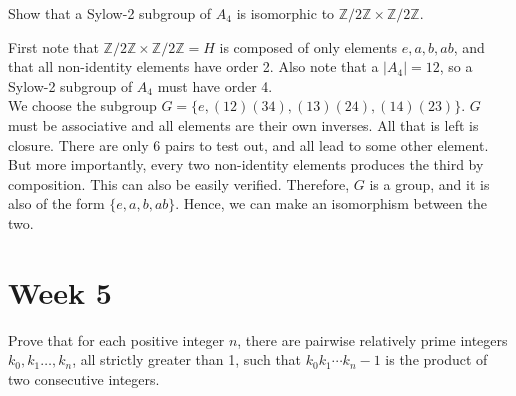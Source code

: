 \documentclass{scrartcl}
\begin{document}
\begin{problem}[7]
    Show that a Sylow-2 subgroup of $A_4$ is isomorphic to $\mathbb{Z}/2\mathbb{Z} \times \mathbb{Z}/2\mathbb{Z}$.
\end{problem}

\begin{soln}
    First note that $\mathbb{Z}/2\mathbb{Z} \times \mathbb{Z}/2\mathbb{Z}=H$ is composed of only elements $e, a, b, ab$, and that all non-identity elements have order 2. Also note that a $|A_4| = 12$, so a Sylow-2 subgroup of $A_4$ must have order 4. \\
    We choose the subgroup $G = \{ e, (12)(34), (13)(24), (14)(23) \}$. $G$ must be associative and all elements are their own inverses. All that is left is closure. There are only $6$ pairs to test out, and all lead to some other element. But more importantly, every two non-identity elements produces the third by composition. This can also be easily verified. Therefore, $G$ is a group, and it is also of the form $\{ e, a, b, ab \}$. Hence, we can make an isomorphism between the two.  
\end{soln}

\section{Week 5}

\begin{problem}[12]
	Prove that for each positive integer $n$, there are pairwise relatively prime integers $k_0, k_1 \dotsc, k_n$, all strictly greater than 1, such that $k_0 k_1 \dotsm k_n -1$ is the product of two consecutive integers.
\end{problem}
\end{document}
